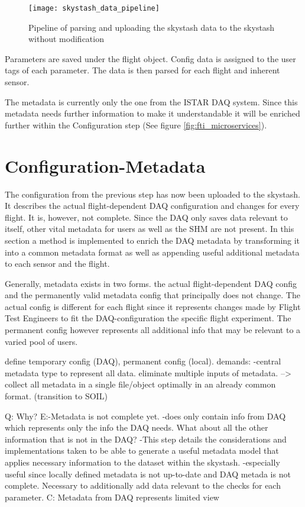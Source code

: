 \begin{figure}
    \centering
    \texttt{[image: skystash\_data\_pipeline]}
    \caption{Pipeline of parsing and uploading the skystash data to the skystash without modification}
    \label{fig:skystash_data_pipeline}
\end{figure}

Parameters are saved under the flight object. Config data is assigned to the user tags of each parameter. The data is then parsed for each flight and inherent sensor.

The metadata is currently only the one from the ISTAR DAQ system. Since this metadata needs further information to make it understandable  it will be enriched further within the Configuration step (See figure \ref{fig:fti_microservices}).


\section{Configuration-Metadata}

The configuration from the previous step has now been uploaded to the skystash. It describes the actual flight-dependent DAQ configuration and changes for every flight. It is, however, not complete. Since the DAQ only saves data relevant to itself, other vital metadata for users as well as the SHM are not present. In this section a method is implemented to enrich the DAQ metadata by transforming it into a common metadata format as well as appending useful additional metadata to each sensor and the flight.


Generally, metadata exists in two forms. the actual flight-dependent DAQ config and the permanently valid metadata config that principally does not change.
The actual config is different for each flight since it represents changes made by Flight Test Engineers to fit the DAQ-configuration the specific flight experiment. The permanent config however represents all additional info that may be relevant to a varied pool of users.




define temporary config (DAQ), permanent config (local).
demands:
-central metadata type to represent all data. eliminate multiple inputs of metadata.
--> collect all metadata in a single file/object
optimally in an already common format. (transition to SOIL)


Q: Why?
E:-Metadata is not complete yet. -does only contain info from DAQ which represents only the info the DAQ needs. What about all the other information that is not in the DAQ?
-This step details the considerations and implementations taken to be able to generate a useful metadata model that applies necessary information to the dataset within the skystash.
-especially useful since locally defined metadata is not up-to-date and DAQ metada is not complete. Necessary to additionally add data relevant to the checks for each parameter.
C: Metadata from DAQ represents limited view

